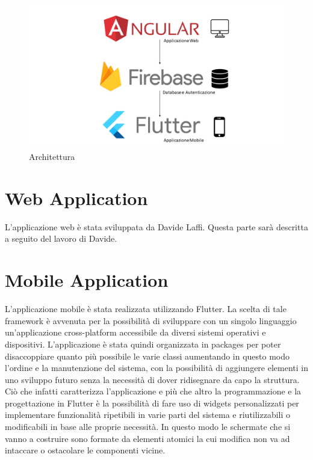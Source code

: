 \documentclass[12pt,a4paper,twoside,openright,titlepage]{book}
\begin{document}
\begin{figure}[H]
\centering
\includegraphics[scale = 0.4]{architecture}
\caption{Architettura}
\end{figure}

\section{Web Application}
L'applicazione web è stata sviluppata da Davide Laffi. Questa parte sarà descritta a seguito del lavoro di Davide.

\section{Mobile Application}
L'applicazione mobile è stata realizzata utilizzando Flutter. La scelta di tale framework è avvenuta per la possibilità di sviluppare con un singolo linguaggio un'applicazione cross-platform accessibile da diversi sistemi operativi e dispositivi. L'applicazione è stata quindi organizzata in packages per poter disaccoppiare quanto più possibile le varie classi aumentando in questo modo l'ordine e la manutenzione del sistema, con la possibilità di aggiungere elementi in uno sviluppo futuro senza la necessità di dover ridisegnare da capo la struttura. Ciò che infatti caratterizza l'applicazione e più che altro la programmazione e la progettazione in Flutter è la possibilità di fare uso di widgets personalizzati per implementare funzionalità ripetibili in varie parti del sistema e riutilizzabili o modificabili in base alle proprie necessità. In questo modo le schermate che si vanno a costruire sono formate da elementi atomici la cui modifica non va ad intaccare o ostacolare le componenti vicine.
\end{document}
